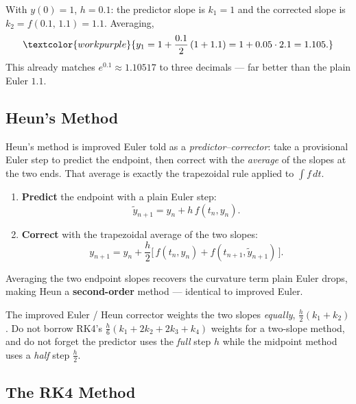 \begin{examplebox}[Worked Example 5.2: Improved Euler for $y'=y$]
With $y(0)=1$, $h=0.1$: the predictor slope is $k_1=1$ and the corrected slope is
$k_2=f(0.1,\,1.1)=1.1$. Averaging,
\[ \textcolor{workpurple}{y_1 = 1 + \frac{0.1}{2}\left(1 + 1.1\right) = 1 + 0.05\cdot 2.1 = 1.105.} \]
This already matches $e^{0.1}\approx 1.10517$ to three decimals --- far better than
the plain Euler $1.1$.
\end{examplebox}

\subsection{Heun's Method}

Heun's method is improved Euler told as a \emph{predictor--corrector}: take a
provisional Euler step to predict the endpoint, then correct with the
\emph{average} of the slopes at the two ends. That average is exactly the
trapezoidal rule applied to $\int f\,dt$.

\begin{methodbox}
\begin{enumerate}[leftmargin=1.6em, itemsep=2pt]
    \item \textbf{Predict} the endpoint with a plain Euler step:
          \[ \tilde{y}_{n+1} = y_n + h\,f(t_n,y_n). \]
    \item \textbf{Correct} with the trapezoidal average of the two slopes:
          \[ y_{n+1} = y_n + \frac{h}{2}\Big[\,f(t_n,y_n) + f(t_{n+1},\tilde{y}_{n+1})\,\Big]. \]
\end{enumerate}
Averaging the two endpoint slopes recovers the curvature term plain Euler drops,
making Heun a \textbf{second-order} method --- identical to improved Euler.
\end{methodbox}

\begin{warningbox}
The improved Euler / Heun corrector weights the two slopes \emph{equally},
$\tfrac{h}{2}(k_1+k_2)$. Do not borrow RK4's $\tfrac{h}{6}(k_1+2k_2+2k_3+k_4)$
weights for a two-slope method, and do not forget the predictor uses the
\emph{full} step $h$ while the midpoint method uses a \emph{half} step
$\tfrac{h}{2}$.
\end{warningbox}

\subsection{The RK4 Method}

